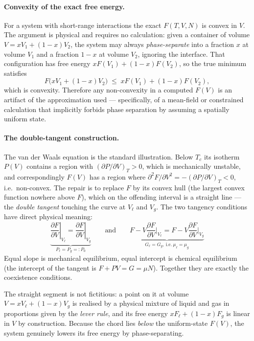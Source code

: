 \documentclass[10pt,a4paper]{article}
\theoremstyle{remark}
\begin{document}
\paragraph{Convexity of the exact free energy.}

For a system with short-range interactions the exact $F(T,V,N)$ is convex in $V$.
The argument is physical and requires no calculation: given a container of volume
$V=xV_1+(1-x)V_2$, the system may always \emph{phase-separate} into a fraction $x$
at volume $V_1$ and a fraction $1-x$ at volume $V_2$, ignoring the interface. That
configuration has free energy $xF(V_1)+(1-x)F(V_2)$, so the true minimum satisfies
\[
F\big(xV_1+(1-x)V_2\big)\;\leq\;xF(V_1)+(1-x)F(V_2),
\]
which is convexity. Therefore any non-convexity in a computed $F(V)$ is an
artifact of the approximation used --- specifically, of a mean-field or
constrained calculation that implicitly forbids phase separation by assuming a
spatially uniform state.

\paragraph{The double-tangent construction.}

The van der Waals equation is the standard illustration. Below $T_c$ its isotherm
$P(V)$ contains a region with $(\partial P/\partial V)_T>0$, which is mechanically
unstable, and correspondingly $F(V)$ has a region where
$\partial^2F/\partial V^2=-(\partial P/\partial V)_T<0$, i.e.\ non-convex. The
repair is to replace $F$ by its convex hull (the largest convex function
nowhere above $F$), which on the offending interval is a
straight line --- the \emph{double tangent} touching the curve at $V_\ell$ and
$V_g$. The two tangency conditions have direct physical meaning:
\[
\underbrace{\left.\frac{\partial F}{\partial V}\right|_{V_\ell}
=\left.\frac{\partial F}{\partial V}\right|_{V_g}}_{\textstyle P_\ell=P_g=:P_0}
\qquad\text{and}\qquad
\underbrace{F-V\frac{\partial F}{\partial V}\Big|_{V_\ell}
=F-V\frac{\partial F}{\partial V}\Big|_{V_g}}_{\textstyle G_\ell=G_g,\ \text{i.e.}\ \mu_\ell=\mu_g}
\]
Equal slope is mechanical equilibrium, equal intercept is chemical equilibrium
(the intercept of the tangent is $F+PV=G=\mu N$). Together they are exactly the
coexistence conditions.

The straight segment is not fictitious: a point on it at volume
$V=xV_\ell+(1-x)V_g$ is realised by a physical mixture of liquid and gas in
proportions given by the \emph{lever rule}, and its free energy
$xF_\ell+(1-x)F_g$ is linear in $V$ by construction. Because the chord lies
\emph{below} the uniform-state $F(V)$, the system genuinely lowers its free energy
by phase-separating.
\end{document}
